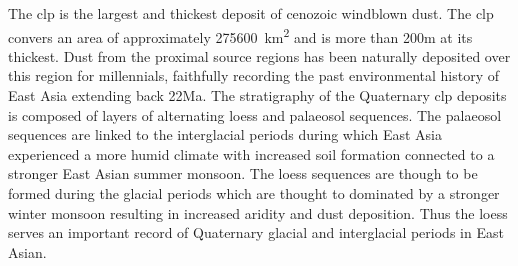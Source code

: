 \thispagestyle{plain}
The \acrfull{clp} is the largest and thickest deposit of cenozoic windblown dust. The \acrshort{clp} convers an area of approximately \SI{275600}{\kilo\metre\squared} and is more than 200\si{\metre} at its thickest. Dust from the proximal source regions has been naturally deposited over this region for millennials, faithfully recording the past environmental history of East Asia extending back 22Ma. The stratigraphy of the Quaternary \acrshort{clp} deposits is composed of layers of alternating loess and palaeosol sequences. The palaeosol sequences are linked to the interglacial periods during which East Asia experienced a more humid climate with  increased soil formation connected to a stronger East Asian summer monsoon. The loess sequences are though to be formed during the glacial periods which are thought to dominated by a stronger winter monsoon resulting in increased aridity and dust deposition. Thus the loess serves an important record of Quaternary glacial and interglacial periods in East Asian.

